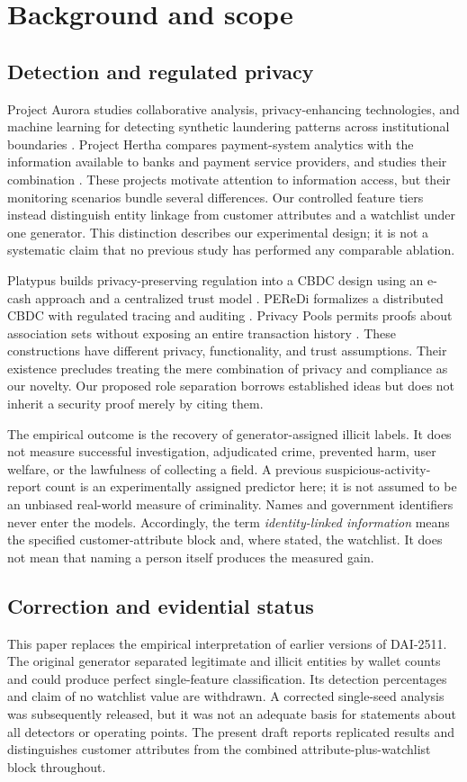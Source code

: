 \documentclass[11pt,a4paper]{article}
\begin{document}
\section{Background and scope}
\subsection{Detection and regulated privacy}
Project Aurora studies collaborative analysis, privacy-enhancing technologies, and machine learning for detecting synthetic laundering patterns across institutional boundaries \citep{Aurora}. Project Hertha compares payment-system analytics with the information available to banks and payment service providers, and studies their combination \citep{Hertha}. These projects motivate attention to information access, but their monitoring scenarios bundle several differences. Our controlled feature tiers instead distinguish entity linkage from customer attributes and a watchlist under one generator. This distinction describes our experimental design; it is not a systematic claim that no previous study has performed any comparable ablation.

Platypus builds privacy-preserving regulation into a CBDC design using an e-cash approach and a centralized trust model \citep{Platypus}. PEReDi formalizes a distributed CBDC with regulated tracing and auditing \citep{PEReDi}. Privacy Pools permits proofs about association sets without exposing an entire transaction history \citep{Pools}. These constructions have different privacy, functionality, and trust assumptions. Their existence precludes treating the mere combination of privacy and compliance as our novelty. Our proposed role separation borrows established ideas but does not inherit a security proof merely by citing them.

The empirical outcome is the recovery of generator-assigned illicit labels. It does not measure successful investigation, adjudicated crime, prevented harm, user welfare, or the lawfulness of collecting a field. A previous suspicious-activity-report count is an experimentally assigned predictor here; it is not assumed to be an unbiased real-world measure of criminality. Names and government identifiers never enter the models. Accordingly, the term \emph{identity-linked information} means the specified customer-attribute block and, where stated, the watchlist. It does not mean that naming a person itself produces the measured gain.

\subsection{Correction and evidential status}
This paper replaces the empirical interpretation of earlier versions of DAI-2511. The original generator separated legitimate and illicit entities by wallet counts and could produce perfect single-feature classification. Its detection percentages and claim of no watchlist value are withdrawn. A corrected single-seed analysis was subsequently released, but it was not an adequate basis for statements about all detectors or operating points. The present draft reports replicated results and distinguishes customer attributes from the combined attribute-plus-watchlist block throughout.
\end{document}
